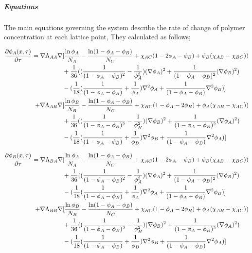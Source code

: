 \documentclass{article}
\numberwithin{equation}{section} %
\begin{document}
\subparagraph{Equations} The main equations governing the system describe the rate of change of polymer concentration at each lattice point, They calculated as follows;
 
 \begin{align}
\frac{\partial \phi _{A}(x, \tau )}{\partial \tau}=\nabla \Lambda _{AA} \nabla &[\frac{\ln \phi _{A}}{N_{A}} - \frac{\ln (1- \phi _{A} - \phi _{B})}{N_{C}}+\chi _{AC}(1-2\phi _{A} - \phi _{B})+\phi _{B}(\chi _{AB} - \chi _{BC}))  \notag \\
& + \frac{1}{36}((\frac{1}{(1 - \phi _{A} - \phi _{B})^2} - \frac{1}{\phi _{A}^2})(\nabla \phi _{A})^2 +\frac{1}{(1-\phi _{A} - \phi _{B})^2}(\nabla \phi _{B})^2) \notag \\
& -(\frac{1}{18}(\frac{1}{(1- \phi _{A} - \phi _{B})} + \frac{1}{\phi _{A}})\nabla ^2\phi _{A} + \frac{1}{(1 - \phi _{A} - \phi _{B})}\nabla ^2\phi _{B})] \notag \\
+ \nabla \Lambda _{AB} \nabla &[\frac{\ln \phi _{B}}{N_{B}} - \frac{\ln (1- \phi _{A} - \phi _{B})}{N_{C}}+\chi _{BC}(1-\phi _{A} - 2\phi _{B})+\phi _{A}(\chi _{AB} - \chi _{AC}))  \notag \\
& + \frac{1}{36}((\frac{1}{(1 - \phi _{A} - \phi _{B})^2} - \frac{1}{\phi _{B}^2})(\nabla \phi _{B})^2 +\frac{1}{(1-\phi _{A} - \phi _{B})^2}(\nabla \phi _{A})^2) \notag \\
& -(\frac{1}{18}(\frac{1}{(1- \phi _{A} - \phi _{B})} + \frac{1}{\phi _{B}})\nabla ^2\phi _{B} + \frac{1}{(1 - \phi _{A} - \phi _{B})}\nabla ^2\phi _{A})] 
\end{align}

 \begin{align}
\frac{\partial \phi _{B}(x, \tau )}{\partial \tau}=\nabla \Lambda _{BA} \nabla &[\frac{\ln \phi _{A}}{N_{A}} - \frac{\ln (1- \phi _{A} - \phi _{B})}{N_{C}}+\chi _{AC}(1-2\phi _{A} - \phi _{B})+\phi _{B}(\chi _{AB} - \chi _{BC}))  \notag \\
& + \frac{1}{36}((\frac{1}{(1 - \phi _{A} - \phi _{B})^2} - \frac{1}{\phi _{A}^2})(\nabla \phi _{A})^2 +\frac{1}{(1-\phi _{A} - \phi _{B})^2}(\nabla \phi _{B})^2) \notag \\
& -(\frac{1}{18}(\frac{1}{(1- \phi _{A} - \phi _{B})} + \frac{1}{\phi _{A}})\nabla ^2\phi _{A} + \frac{1}{(1 - \phi _{A} - \phi _{B})}\nabla ^2\phi _{B})] \notag \\
+ \nabla \Lambda _{BB} \nabla &[\frac{\ln \phi _{B}}{N_{B}} - \frac{\ln (1- \phi _{A} - \phi _{B})}{N_{C}}+\chi _{BC}(1-\phi _{A} - 2\phi _{B})+\phi _{A}(\chi _{AB} - \chi _{AC}))  \notag \\
& + \frac{1}{36}((\frac{1}{(1 - \phi _{A} - \phi _{B})^2} - \frac{1}{\phi _{B}^2})(\nabla \phi _{B})^2 +\frac{1}{(1-\phi _{A} - \phi _{B})^2}(\nabla \phi _{A})^2) \notag \\
& -(\frac{1}{18}(\frac{1}{(1- \phi _{A} - \phi _{B})} + \frac{1}{\phi _{B}})\nabla ^2\phi _{B} + \frac{1}{(1 - \phi _{A} - \phi _{B})}\nabla ^2\phi _{A})] 
\end{align}
\end{document}
